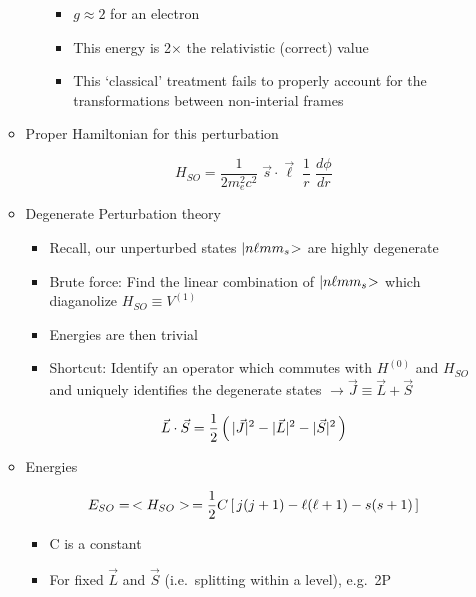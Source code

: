 \documentclass[12pt,letterpaper]{article}
\begin{document}
\begin{Aenumerate}
\begin{itemize}
\begin{itemize}
\begin{itemize}
			\begin{itemize}
			\item $g \approx 2$ for an electron
			\item This energy is 2$\times$ the relativistic 
			  (correct) value
			\item This `classical' treatment fails to properly
			account for the transformations between non-interial frames
			\end{itemize}

		\end{itemize}
	\item Proper Hamiltonian for this perturbation

\begin{equation}
H_{SO} = \frac{1}{2 m_e^2 c^2} \; \vec s \cdot \vec \ell \; \frac{1}{r} \;
\frac{d\phi}{dr}
\end{equation}

	\item Degenerate Perturbation theory

		\begin{itemize}
		\item Recall, our unperturbed states ${|n \ell m m_s\negmedspace>}$ are highly degenerate
		\item Brute force:  Find the linear combination of 
		  ${|n \ell m m_s\negmedspace>}$ which \\ diaganolize $H_{SO} \equiv V^{(1)}$
		\item Energies are then trivial
		\item Shortcut:  Identify an operator which commutes with 
		$H^{(0)}$ and $H_{SO}$ and uniquely identifies the degenerate	
		states  $\to \vec J \equiv \vec L + \vec S$
		\end{itemize}

\begin{equation*}
\vec L \cdot \vec S = \frac{1}{2} \left ( \, |\vec J|^2 - |\vec L|^2 - |\vec S|^2 \, \right )
\end{equation*}

	\item Energies

\begin{equation}
E_{SO} = \, <H_{SO}> \, = \frac{1}{2} C \left [ \, j(j+1) - \ell(\ell+1) - s(s+1) \, \right ]
\end{equation}

		\begin{itemize}
		\item C is a constant 
		\item For fixed $\vec L$ and $\vec S$ (i.e.\ splitting within a level), 
		e.g.\ 2P


\end{itemize}
\end{itemize}
\end{itemize}
\end{Aenumerate}
\end{document}
